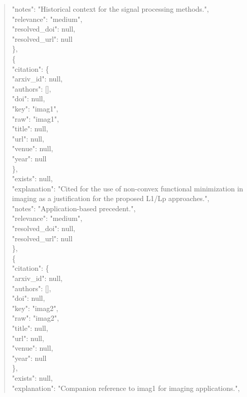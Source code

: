 \documentclass[11pt]{article}
\begin{document}
\begin{quote}
      "notes": "Historical context for the signal processing methods.",\\
      "relevance": "medium",\\
      "resolved\_doi": null,\\
      "resolved\_url": null\\
    \},\\
    \{\\
      "citation": \{\\
        "arxiv\_id": null,\\
        "authors": [],\\
        "doi": null,\\
        "key": "imag1",\\
        "raw": "imag1",\\
        "title": null,\\
        "url": null,\\
        "venue": null,\\
        "year": null\\
      \},\\
      "exists": null,\\
      "explanation": "Cited for the use of non-convex functional minimization in imaging as a justification for the proposed L1/Lp approaches.",\\
      "notes": "Application-based precedent.",\\
      "relevance": "medium",\\
      "resolved\_doi": null,\\
      "resolved\_url": null\\
    \},\\
    \{\\
      "citation": \{\\
        "arxiv\_id": null,\\
        "authors": [],\\
        "doi": null,\\
        "key": "imag2",\\
        "raw": "imag2",\\
        "title": null,\\
        "url": null,\\
        "venue": null,\\
        "year": null\\
      \},\\
      "exists": null,\\
      "explanation": "Companion reference to imag1 for imaging applications.",\\

\end{quote}
\end{document}
